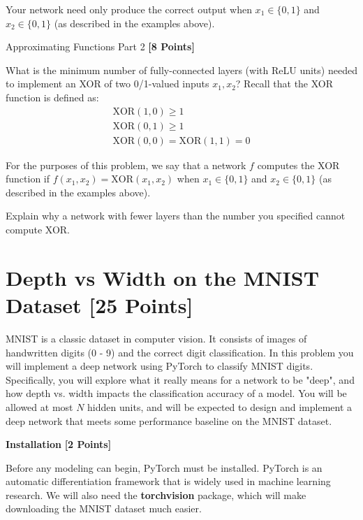 Your network need only produce the correct output when $x_1 \in \{0, 1\}$ and $x_2 \in \{0, 1\}$ (as described in the examples above).

\begin{subsolution}

\end{subsolution}

\newpage


\problem Approximating Functions Part 2 \textbf{[8 Points]}

What is the minimum number of fully-connected layers (with ReLU units) needed to implement an XOR of two 0/1-valued inputs $x_1, x_2$? Recall that the XOR function is defined as:
\begin{gather*}
\text{XOR}(1, 0) \geq 1 \\
\text{XOR}(0, 1) \geq 1 \\
\text{XOR}(0, 0) = \text{XOR}(1, 1) = 0
\end{gather*}

For the purposes of this problem, we say that a network $f$ computes the XOR function if $f(x_1, x_2) = \text{XOR}(x_1, x_2)$ when $x_1 \in \{0, 1\}$ and $x_2 \in \{0, 1\}$ (as described in the examples above).

Explain why a network with fewer layers than the number you specified cannot compute XOR.

\begin{subsolution}

\end{subsolution}


\newpage
\section{Depth vs Width on the MNIST Dataset  [25 Points]}

MNIST is a classic dataset in computer vision. It consists of images of handwritten digits (0 - 9) and the correct digit classification. In this problem you will implement a deep network using PyTorch to classify MNIST digits. Specifically, you will explore what it really means for a network to be "deep", and how depth vs. width impacts the classification accuracy of a model. You will be allowed at most $N$ hidden units, and will be expected to design and implement a deep network that meets some performance baseline on the MNIST dataset.

\problem \textbf{Installation} \textbf{[2 Points]}

Before any modeling can begin, PyTorch must be installed. PyTorch is an automatic differentiation framework that is widely used in machine learning research.  We will also need the \textbf{torchvision} package, which will make downloading the MNIST dataset much easier. 

